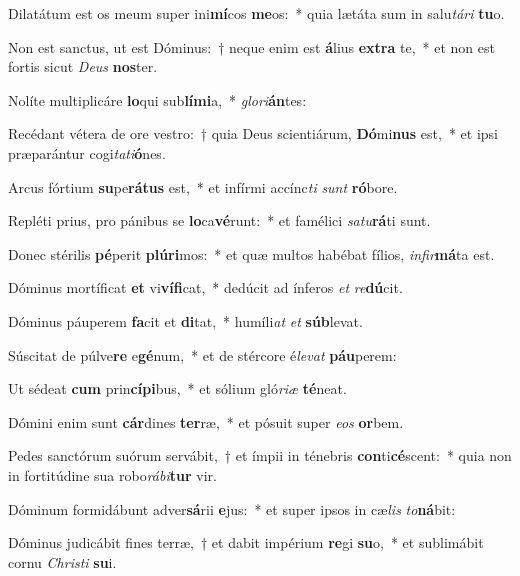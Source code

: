 \item Dilatátum est os meum super ini\textbf{mí}cos \textbf{me}os:~* quia lætáta sum in salu\textit{tá}\textit{ri} \textbf{tu}o.
\item Non est sanctus, ut est Dóminus:~† neque enim est \textbf{á}lius \textbf{ex}\textbf{tra} te,~* et non est fortis sicut \textit{De}\textit{us} \textbf{nos}ter.
\item Nolíte multiplicáre \textbf{lo}qui sub\textbf{lí}\textbf{mi}a,~* \textit{glo}\textit{ri}\textbf{án}tes:
\item Recédant vétera de ore vestro:~† quia Deus scientiárum, \textbf{Dó}mi\textbf{nus} est,~* et ipsi præparántur cogi\textit{ta}\textit{ti}\textbf{ó}nes.
\item Arcus fórtium \textbf{su}pe\textbf{rá}\textbf{tus} est,~* et infírmi accínc\textit{ti} \textit{sunt} \textbf{ró}bore.
\item Repléti prius, pro pánibus se \textbf{lo}ca\textbf{vé}runt:~* et famélici \textit{sa}\textit{tu}\textbf{rá}ti sunt.
\item Donec stérilis \textbf{pé}perit \textbf{plú}\textbf{ri}mos:~* et quæ multos habébat fílios, \textit{in}\textit{fir}\textbf{má}ta est.
\item Dóminus mortíficat \textbf{et} vi\textbf{ví}\textbf{fi}cat,~* dedúcit ad ínferos \textit{et} \textit{re}\textbf{dú}cit.
\item Dóminus páuperem \textbf{fa}cit et \textbf{di}tat,~* humíli\textit{at} \textit{et} \textbf{súb}levat.
\item Súscitat de púlve\textbf{re} e\textbf{gé}num,~* et de stércore é\textit{le}\textit{vat} \textbf{páu}perem:
\item Ut sédeat \textbf{cum} prin\textbf{cí}\textbf{pi}bus,~* et sólium gló\textit{ri}\textit{æ} \textbf{té}neat.
\item Dómini enim sunt \textbf{cár}dines \textbf{ter}ræ,~* et pósuit super \textit{e}\textit{os} \textbf{or}bem.
\item Pedes sanctórum suórum servábit,~† et ímpii in ténebris \textbf{con}ti\textbf{cé}scent:~* quia non in fortitúdine sua robo\textit{rá}\textit{bi}\textbf{tur} vir.
\item Dóminum formidábunt adver\textbf{sá}rii \textbf{e}jus:~* et super ipsos in cæ\textit{lis} \textit{to}\textbf{ná}bit:
\item Dóminus judicábit fines terræ,~† et dabit impérium \textbf{re}gi \textbf{su}o,~* et sublimábit cornu \textit{Chris}\textit{ti} \textbf{su}i.
